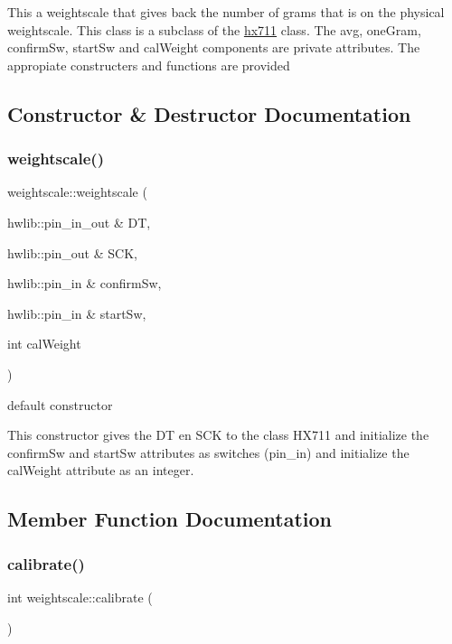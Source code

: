This a weightscale that gives back the number of grams that is on the physical weightscale. This class is a subclass of the \hyperlink{classhx711}{hx711} class. The avg, one\+Gram, confirm\+Sw, start\+Sw and cal\+Weight components are private attributes. The appropiate constructers and functions are provided 

\subsection{Constructor \& Destructor Documentation}
\mbox{\label{classweightscale_af3fdbd1531f9a9e35e8ca02d52d5233d}} 
\subsubsection{\texorpdfstring{weightscale()}{weightscale()}}
{\footnotesize\ttfamily weightscale\+::weightscale (\begin{DoxyParamCaption}\item[{hwlib\+::pin\+\_\+in\+\_\+out \&}]{DT,  }\item[{hwlib\+::pin\+\_\+out \&}]{S\+CK,  }\item[{hwlib\+::pin\+\_\+in \&}]{confirm\+Sw,  }\item[{hwlib\+::pin\+\_\+in \&}]{start\+Sw,  }\item[{int}]{cal\+Weight }\end{DoxyParamCaption})}



default constructor 

This constructor gives the DT en S\+CK to the class H\+X711 and initialize the confirm\+Sw and start\+Sw attributes as switches (pin\+\_\+in) and initialize the cal\+Weight attribute as an integer. 

\subsection{Member Function Documentation}
\mbox{\label{classweightscale_a37e3e26203e4036b76d2921dc7f3d25c}} 
\subsubsection{\texorpdfstring{calibrate()}{calibrate()}}
{\footnotesize\ttfamily int weightscale\+::calibrate (\begin{DoxyParamCaption}{ }\end{DoxyParamCaption})}



